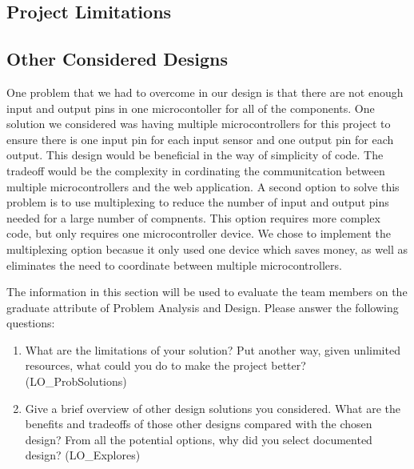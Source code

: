 \documentclass[12pt, titlepage]{article}
\begin{document}
\subsection*{Project Limitations}

\subsection*{Other Considered Designs}
One problem that we had to overcome in our design is that there are not enough input and output pins in one microcontoller for all of the components.
One solution we considered was having multiple microcontrollers for this project to ensure there is one input pin for each input sensor and one output pin for each output.
This design would be beneficial in the way of simplicity of code. The tradeoff would be the complexity in cordinating the communitcation between multiple microcontrollers and the 
web application. A second option to solve this problem is to use multiplexing to reduce the number of input and output pins needed for a large number of compnents. 
This option requires more complex code, but only requires one microcontroller device. We chose to implement the multiplexing option becasue it only used one device which saves money,
as well as eliminates the need to coordinate between multiple microcontrollers. 

The information in this section will be used to evaluate the team members on the
graduate attribute of Problem Analysis and Design.  Please answer the following questions:

\begin{enumerate}
  \item What are the limitations of your solution?  Put another way, given
  unlimited resources, what could you do to make the project better? (LO\_ProbSolutions)
  \item Give a brief overview of other design solutions you considered.  What
  are the benefits and tradeoffs of those other designs compared with the chosen
  design?  From all the potential options, why did you select documented design?
  (LO\_Explores)
\end{enumerate}
\end{document}
